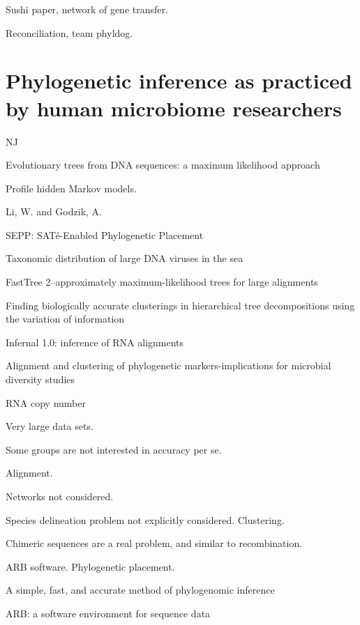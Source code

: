\documentclass{amsart}
\begin{document}
Sushi paper, network of gene transfer.

Reconciliation, team phyldog.


\section{Phylogenetic inference as practiced by human microbiome researchers}

NJ

\cite{felsenstein1981evolutionary}
{Evolutionary trees from DNA sequences: a maximum likelihood approach}

\cite{eddy1998profile}
Profile hidden Markov models.

\cite{li2006cdhit}
Li, W.  and Godzik, A.
\cite{edgar2010usearch}

\cite{mirarabsepp}
{SEPP: SAT{\'e}-Enabled Phylogenetic Placement}

\cite{monierEaLargeViruses08}
{Taxonomic distribution of large DNA viruses in the sea}

\cite{huson2007megan}

\cite{price2010fasttree}
{FastTree 2--approximately maximum-likelihood trees for large alignments}

\cite{navlakha2009finding}
Finding biologically accurate clusterings in hierarchical tree decompositions using the variation of information

\cite{nawrocki2009infernal}
Infernal 1.0: inference of RNA alignments

\cite{white2010alignment}
Alignment and clustering of phylogenetic markers-implications for microbial diversity studies

RNA copy number
\cite{morgan2010metagenomic}


Very large data sets.

Some groups are not interested in accuracy per se.

Alignment.

Networks not considered.

Species delineation problem not explicitly considered. Clustering.

Chimeric sequences are a real problem, and similar to recombination.

ARB software.
Phylogenetic placement.

\cite{wu2008simple}
A simple, fast, and accurate method of phylogenomic inference

\cite{matsen2010pplacer}

\cite{ludwig2004arb}
{{ARB}: a software environment for sequence data}
\cite{berger2011performance}
\end{document}
